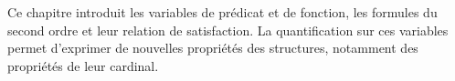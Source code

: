\documentclass[../../../include/open-logic-chapter]{subfiles}
\begin{document}

Ce chapitre introduit les variables de prédicat et de fonction, les
formules du second ordre et leur relation de satisfaction. La
quantification sur ces variables permet d'exprimer de nouvelles
propriétés des structures, notamment des propriétés de leur cardinal.







\OLEndChapterHook
\end{document}
